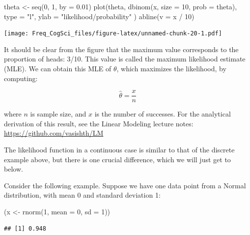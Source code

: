 \documentclass[
  12pt,
]{krantz}
\newenvironment{Shaded}{\begin{snugshade}}{\end{snugshade}}
\newcommand{\AttributeTok}[1]{\textcolor[rgb]{0.77,0.63,0.00}{#1}}
\newcommand{\DecValTok}[1]{\textcolor[rgb]{0.00,0.00,0.81}{#1}}
\newcommand{\FloatTok}[1]{\textcolor[rgb]{0.00,0.00,0.81}{#1}}
\newcommand{\FunctionTok}[1]{\textcolor[rgb]{0.00,0.00,0.00}{#1}}
\newcommand{\NormalTok}[1]{#1}
\newcommand{\OtherTok}[1]{\textcolor[rgb]{0.56,0.35,0.01}{#1}}
\newcommand{\SpecialCharTok}[1]{\textcolor[rgb]{0.00,0.00,0.00}{#1}}
\newcommand{\StringTok}[1]{\textcolor[rgb]{0.31,0.60,0.02}{#1}}
\theoremstyle{definition}
\theoremstyle{definition}
\theoremstyle{definition}
\theoremstyle{definition}
\theoremstyle{remark}
\begin{document}
\begin{Shaded}
\begin{Highlighting}[]
\NormalTok{theta }\OtherTok{\textless{}{-}} \FunctionTok{seq}\NormalTok{(}\DecValTok{0}\NormalTok{, }\DecValTok{1}\NormalTok{, }\AttributeTok{by =} \FloatTok{0.01}\NormalTok{)}
\FunctionTok{plot}\NormalTok{(theta, }\FunctionTok{dbinom}\NormalTok{(x, }\AttributeTok{size =} \DecValTok{10}\NormalTok{, }\AttributeTok{prob =}\NormalTok{ theta),}
  \AttributeTok{type =} \StringTok{"l"}\NormalTok{,}
  \AttributeTok{ylab =} \StringTok{"likelihood/probability"}
\NormalTok{)}
\FunctionTok{abline}\NormalTok{(}\AttributeTok{v =}\NormalTok{ x }\SpecialCharTok{/} \DecValTok{10}\NormalTok{)}
\end{Highlighting}
\end{Shaded}

\texttt{[image: Freq\_CogSci\_files/figure-latex/unnamed-chunk-20-1.pdf]}

It should be clear from the figure that the maximum value corresponds to the proportion of heads: 3/10. This value is called the maximum likelihood estimate (MLE). We can obtain this MLE of \(\theta\), which maximizes the likelihood, by computing:

\begin{equation}
\hat \theta = \frac{x}{n}
\end{equation}

where \(n\) is sample size, and \(x\) is the number of successes. For the analytical derivation of this result, see the Linear Modeling lecture notes:
\url{https://github.com/vasishth/LM}

The likelihood function in a continuous case is similar to that of the discrete example above, but there is one crucial difference, which we will just get to below.

Consider the following example. Suppose we have one data point from a Normal distribution, with mean 0 and standard deviation 1:

\begin{Shaded}
\begin{Highlighting}[]
\NormalTok{(x }\OtherTok{\textless{}{-}} \FunctionTok{rnorm}\NormalTok{(}\DecValTok{1}\NormalTok{, }\AttributeTok{mean =} \DecValTok{0}\NormalTok{, }\AttributeTok{sd =} \DecValTok{1}\NormalTok{))}
\end{Highlighting}
\end{Shaded}

\begin{verbatim}
## [1] 0.948
\end{verbatim}
\end{document}
